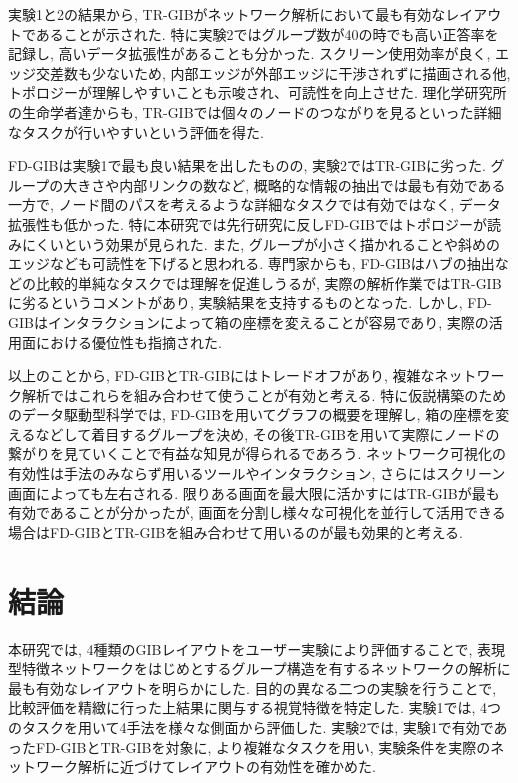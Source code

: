 \documentclass{kuee}
\begin{document}
実験1と2の結果から, TR-GIBがネットワーク解析において最も有効なレイアウトであることが示された.
特に実験2ではグループ数が40の時でも高い正答率を記録し, 高いデータ拡張性があることも分かった.
スクリーン使用効率が良く, エッジ交差数も少ないため, 内部エッジが外部エッジに干渉されずに描画される他, トポロジーが理解しやすいことも示唆され、可読性を向上させた.
理化学研究所の生命学者達からも, TR-GIBでは個々のノードのつながりを見るといった詳細なタスクが行いやすいという評価を得た.

FD-GIBは実験1で最も良い結果を出したものの, 実験2ではTR-GIBに劣った.
グループの大きさや内部リンクの数など, 概略的な情報の抽出では最も有効である一方で, ノード間のパスを考えるような詳細なタスクでは有効ではなく, データ拡張性も低かった.
特に本研究では先行研究に反しFD-GIBではトポロジーが読みにくいという効果が見られた.
また, グループが小さく描かれることや斜めのエッジなども可読性を下げると思われる.
専門家からも, FD-GIBはハブの抽出などの比較的単純なタスクでは理解を促進しうるが, 実際の解析作業ではTR-GIBに劣るというコメントがあり, 実験結果を支持するものとなった.
しかし, FD-GIBはインタラクションによって箱の座標を変えることが容易であり, 実際の活用面における優位性も指摘された.

以上のことから, FD-GIBとTR-GIBにはトレードオフがあり, 複雑なネットワーク解析ではこれらを組み合わせて使うことが有効と考える.
特に仮説構築のためのデータ駆動型科学では, FD-GIBを用いてグラフの概要を理解し, 箱の座標を変えるなどして着目するグループを決め, その後TR-GIBを用いて実際にノードの繋がりを見ていくことで有益な知見が得られるであろう.
ネットワーク可視化の有効性は手法のみならず用いるツールやインタラクション, さらにはスクリーン画面によっても左右される.
限りある画面を最大限に活かすにはTR-GIBが最も有効であることが分かったが, 画面を分割し様々な可視化を並行して活用できる場合はFD-GIBとTR-GIBを組み合わせて用いるのが最も効果的と考える.


\chapter{結論}
本研究では, 4種類のGIBレイアウトをユーザー実験により評価することで, 表現型特徴ネットワークをはじめとするグループ構造を有するネットワークの解析に最も有効なレイアウトを明らかにした.
目的の異なる二つの実験を行うことで, 比較評価を精緻に行った上結果に関与する視覚特徴を特定した.
実験1では, 4つのタスクを用いて4手法を様々な側面から評価した.
実験2では, 実験1で有効であったFD-GIBとTR-GIBを対象に, より複雑なタスクを用い, 実験条件を実際のネットワーク解析に近づけてレイアウトの有効性を確かめた.
\end{document}
